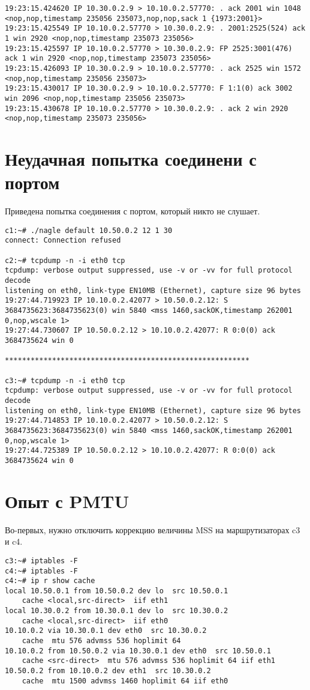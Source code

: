 \documentclass[a4paper,12pt]{article}
\begin{document}
\begin{lstlisting}
19:23:15.424620 IP 10.30.0.2.9 > 10.10.0.2.57770: . ack 2001 win 1048 <nop,nop,timestamp 235056 235073,nop,nop,sack 1 {1973:2001}>
19:23:15.425549 IP 10.10.0.2.57770 > 10.30.0.2.9: . 2001:2525(524) ack 1 win 2920 <nop,nop,timestamp 235073 235056>
19:23:15.425597 IP 10.10.0.2.57770 > 10.30.0.2.9: FP 2525:3001(476) ack 1 win 2920 <nop,nop,timestamp 235073 235056>
19:23:15.426093 IP 10.30.0.2.9 > 10.10.0.2.57770: . ack 2525 win 1572 <nop,nop,timestamp 235056 235073>
19:23:15.430017 IP 10.30.0.2.9 > 10.10.0.2.57770: F 1:1(0) ack 3002 win 2096 <nop,nop,timestamp 235056 235073>
19:23:15.430678 IP 10.10.0.2.57770 > 10.30.0.2.9: . ack 2 win 2920 <nop,nop,timestamp 235073 235056>
\end{lstlisting}

\section{Неудачная попытка соединени с портом}

Приведена попытка соединения с портом, который никто не слушает.
\begin{lstlisting}
c1:~# ./nagle default 10.50.0.2 12 1 30
connect: Connection refused

c2:~# tcpdump -n -i eth0 tcp
tcpdump: verbose output suppressed, use -v or -vv for full protocol decode
listening on eth0, link-type EN10MB (Ethernet), capture size 96 bytes
19:27:44.719923 IP 10.10.0.2.42077 > 10.50.0.2.12: S 3684735623:3684735623(0) win 5840 <mss 1460,sackOK,timestamp 262001 0,nop,wscale 1>
19:27:44.730607 IP 10.50.0.2.12 > 10.10.0.2.42077: R 0:0(0) ack 3684735624 win 0

*********************************************************

c3:~# tcpdump -n -i eth0 tcp
tcpdump: verbose output suppressed, use -v or -vv for full protocol decode
listening on eth0, link-type EN10MB (Ethernet), capture size 96 bytes
19:27:44.714853 IP 10.10.0.2.42077 > 10.50.0.2.12: S 3684735623:3684735623(0) win 5840 <mss 1460,sackOK,timestamp 262001 0,nop,wscale 1>
19:27:44.725389 IP 10.50.0.2.12 > 10.10.0.2.42077: R 0:0(0) ack 3684735624 win 0
\end{lstlisting}

\section{Опыт с PMTU}

Во-первых, нужно отключить коррекцию величины MSS на маршрутизаторах c3 и c4.
\begin{lstlisting}
c3:~# iptables -F
c4:~# iptables -F
c4:~# ip r show cache
local 10.50.0.1 from 10.50.0.2 dev lo  src 10.50.0.1 
    cache <local,src-direct>  iif eth1
local 10.30.0.2 from 10.30.0.1 dev lo  src 10.30.0.2 
    cache <local,src-direct>  iif eth0
10.10.0.2 via 10.30.0.1 dev eth0  src 10.30.0.2 
    cache  mtu 576 advmss 536 hoplimit 64
10.10.0.2 from 10.50.0.2 via 10.30.0.1 dev eth0  src 10.50.0.1 
    cache <src-direct>  mtu 576 advmss 536 hoplimit 64 iif eth1
10.50.0.2 from 10.10.0.2 dev eth1  src 10.30.0.2 
    cache  mtu 1500 advmss 1460 hoplimit 64 iif eth0
\end{lstlisting}
\end{document}
